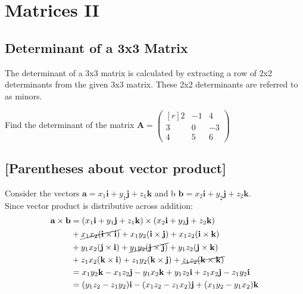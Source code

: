 \newcommand{\adj}{\text{adj}\,}
\newcommand{\identitymatrix}{\begin{bmatrix*}[c]1&0&0\\0&1&0\\0&0&1\end{bmatrix*}}

\chapter{Matrices II}
\section{Determinant of a 3x3 Matrix}
The determinant of a 3x3 matrix is calculated by extracting a row of 2x2 determinants from the given 3x3 matrix. These 2x2 determinants are referred to as minors.

\begin{example}
	Find the determinant of the matrix $\mathbf A = \left(\begin{smallmatrix*}[r]
	2 &-1 &4\\
	3 &0 &-3\\
	4 &5 &6
	\end{smallmatrix*}\right)$
\end{example}
\section{[Parentheses about vector product]}
Consider the vectors $\mathbf{a} = x_1\mathbf{i} + y_1\mathbf{j} + z_1\mathbf{k}$ and b $\mathbf{b} = x_2\mathbf{i} + y_2\mathbf{j} + z_2\mathbf{k}$.\\

Since vector product is distributive across addition:\\

\begin{align*}
	\mathbf{a} \times \mathbf{b} & = \left(  x_1\mathbf{i} + y_1\mathbf{j} + z_1\mathbf{k} \right) \times \left( x_2\mathbf{i} + y_2\mathbf{j} + z_2\mathbf{k} \right)\\
	&+\cancel{x_1x_2(\mathbf i \times \mathbf i)} + x_1y_2(\mathbf i \times \mathbf j) + x_1z_2(\mathbf i \times \mathbf k)\\
	&+ y_1x_2(\mathbf j \times \mathbf i) + \cancel{y_1y_2(\mathbf j \times \mathbf j)} + y_1z_2(\mathbf j \times \mathbf k)\\
	&+z_1x_2(\mathbf k \times \mathbf i) + z_1y_2(\mathbf k \times \mathbf j) + \cancel{z_1z_2(\mathbf k \times \mathbf k)}\\
	&=x_1y_2\mathbf k - x_1z_2\mathbf j - y_1x_2 \mathbf k + y_1z_2\mathbf i +z_1x_2\mathbf j -z_1y_2\mathbf i\\
	&=(y_1z_2-z_1y_2)\mathbf i - (x_1z_2 - z_1 x_2)\mathbf j + (x_1y_2-y_1x_2)\mathbf k
\end{align*}

